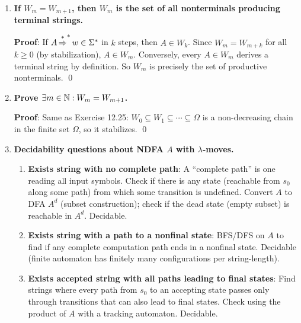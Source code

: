 \begin{enumerate}[{12.}1. ]
\begin{enumerate}
\item \textbf{Proof of monotonicity}: $W_0=\emptyset\subseteq W_1$ (trivially). By induction: if $W_k\subseteq W_{k+1}$, then for any $A\in W_{k+1}$: $A$ derives a terminal string in $\leq k+1$ steps, hence in $\leq k+2$ steps as well, so $A\in W_{k+2}$. Thus $W_{k+1}\subseteq W_{k+2}$. The chain is bounded by $\Omega$. \qed
\end{enumerate}

\item \textbf{If $W_m = W_{m+1}$, then $W_m$ is the set of all nonterminals producing terminal strings.}

\textbf{Proof}: If $A\operatorname{\overset{*}{\Rightarrow}}^* w\in\Sigma^*$ in $k$ steps, then $A\in W_k$. Since $W_m=W_{m+k}$ for all $k\geq 0$ (by stabilization), $A\in W_m$. Conversely, every $A\in W_m$ derives a terminal string by definition. So $W_m$ is precisely the set of productive nonterminals. \qed

\item \textbf{Prove $\exists m\in\mathbb{N}: W_m = W_{m+1}$.}

\textbf{Proof}: Same as Exercise 12.25: $W_0\subseteq W_1\subseteq\cdots\subseteq\Omega$ is a non-decreasing chain in the finite set $\Omega$, so it stabilizes. \qed

\item \textbf{Decidability questions about NDFA $A$ with $\lambda$-moves.}

\begin{enumerate}
\item \textbf{Exists string with no complete path}: A ``complete path'' is one reading all input symbols. Check if there is any state (reachable from $s_0$ along some path) from which some transition is undefined. Convert $A$ to DFA $A^d$ (subset construction); check if the dead state (empty subset) is reachable in $A^d$. Decidable.

\item \textbf{Exists string with a path to a nonfinal state}: BFS/DFS on $A$ to find if any complete computation path ends in a nonfinal state. Decidable (finite automaton has finitely many configurations per string-length).

\item \textbf{Exists accepted string with all paths leading to final states}: Find strings where every path from $s_0$ to an accepting state passes only through transitions that can also lead to final states. Check using the product of $A$ with a tracking automaton. Decidable.


\end{enumerate}
\end{enumerate}
